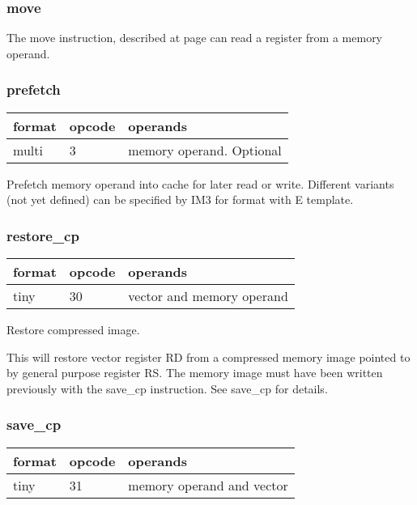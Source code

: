 \documentclass[forwardcom.tex]{subfiles}
\begin{document}
\subsubsection{move}
The move instruction, described at page \pageref{table:moveInstruction}
can read a register from a memory operand.

\subsubsection{prefetch}
\label{table:prefetchInstruction}
\begin{tabular}{|p{12mm}|p{12mm}|p{110mm}|}
\hline
\bfseries format & \bfseries opcode & \bfseries operands \\ \hline
multi & 3 & memory operand. Optional \\ \hline
\end{tabular}
\vspace{2mm}

Prefetch memory operand into cache for later read or write.
Different variants (not yet defined) can be specified by IM3 for format with E template.

\subsubsection{restore\_cp}
\label{table:restoreCpInstruction}
\begin{tabular}{|p{12mm}|p{12mm}|p{110mm}|}
\hline
\bfseries format & \bfseries opcode & \bfseries operands \\ \hline
tiny & 30 & vector and memory operand \\ \hline
\end{tabular}
\vspace{2mm}

Restore compressed image.
\vspace{2mm}

This will restore vector register RD from a compressed memory image pointed to by general purpose register RS.
The memory image must have been written previously with the save\_cp instruction. See save\_cp for details.

\subsubsection{save\_cp}
\label{table:saveCpInstruction}
\begin{tabular}{|p{12mm}|p{12mm}|p{110mm}|}
\hline
\bfseries format & \bfseries opcode & \bfseries operands \\ \hline
tiny & 31 & memory operand and vector \\ \hline
\end{tabular}
\vspace{2mm}
\end{document}
